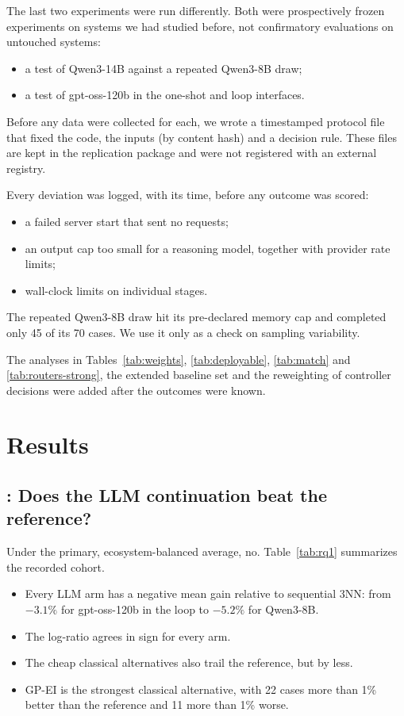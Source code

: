 The last two experiments were run differently. Both were prospectively frozen experiments on systems we had studied before, not confirmatory evaluations on untouched systems:
\begin{itemize}
  \item a test of Qwen3-14B against a repeated Qwen3-8B draw;
  \item a test of gpt-oss-120b in the one-shot and loop interfaces.
\end{itemize}
Before any data were collected for each, we wrote a timestamped protocol file that fixed the code, the inputs (by content hash) and a decision rule. These files are kept in the replication package and were not registered with an external registry.

Every deviation was logged, with its time, before any outcome was scored:
\begin{itemize}
  \item a failed server start that sent no requests;
  \item an output cap too small for a reasoning model, together with provider rate limits;
  \item wall-clock limits on individual stages.
\end{itemize}
The repeated Qwen3-8B draw hit its pre-declared memory cap and completed only 45 of its 70 cases. We use it only as a check on sampling variability.

The analyses in Tables~\ref{tab:weights}, \ref{tab:deployable}, \ref{tab:match} and \ref{tab:routers-strong}, the extended baseline set and the reweighting of controller decisions were added after the outcomes were known.

\section{Results}

\subsection{: Does the LLM continuation beat the reference?}
\label{sec:rq1}

Under the primary, ecosystem-balanced average, no. Table~\ref{tab:rq1} summarizes the recorded cohort.
\begin{itemize}
  \item Every LLM arm has a negative mean gain relative to sequential 3NN: from $-3.1\%$ for gpt-oss-120b in the loop to $-5.2\%$ for Qwen3-8B.
  \item The log-ratio agrees in sign for every arm.
  \item The cheap classical alternatives also trail the reference, but by less.
  \item GP-EI is the strongest classical alternative, with 22 cases more than 1\% better than the reference and 11 more than 1\% worse.
\end{itemize}

